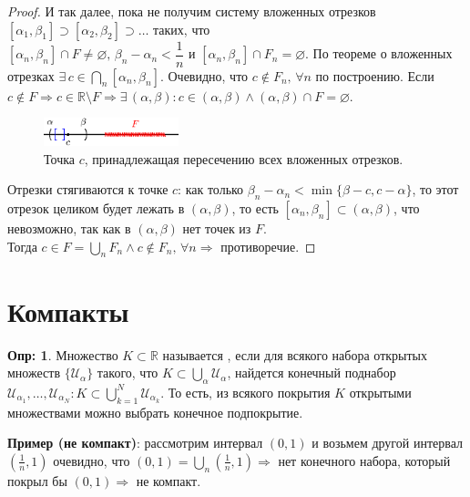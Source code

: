 \documentclass[12pt]{article}
\theoremstyle{definition}
\newtheorem{defn}{Опр:}
\begin{document}
\begin{proof}
	И так далее, пока не получим систему вложенных отрезков $[\alpha_1,\beta_1] \supset [\alpha_2,\beta_2] \supset \dotsc$ таких, что \\
	$[\alpha_n, \beta_n] \cap F \neq \varnothing, \, \beta_n - \alpha_n < \dfrac{1}{n}$ и $[\alpha_n, \beta_n] \cap F_n = \varnothing$. По теореме о вложенных отрезках $\exists \, c \in \bigcap\limits_{n}[\alpha_n,\beta_n]$. Очевидно, что $c \notin F_n, \, \forall n$ по построению. Если $c \notin F \Rightarrow c \in \mathbb{R} \setminus F \Rightarrow \exists \, (\alpha,\beta) \colon c \in (\alpha, \beta) \wedge (\alpha,\beta) \cap F = \varnothing$.

	\begin{figure}[H]
		\centering
		\includegraphics[width=0.35\textwidth]{13_5.eps}
		\caption{Точка $c$, принадлежащая пересечению всех вложенных отрезков.}
		\label{13_5}
	\end{figure}

	Отрезки стягиваются к точке $c$: как только $\beta_n - \alpha_n < \min \{\beta-c,c-\alpha\}$, то этот отрезок целиком будет лежать в $(\alpha,\beta)$, то есть $[\alpha_n, \beta_n] \subset (\alpha, \beta)$, что невозможно, так как в $(\alpha, \beta)$ нет точек из $F$. \\
	Тогда $c \in F = \bigcup\limits_{n} F_n \wedge c \notin F_n, \, \forall n \Rightarrow$ противоречие.
\end{proof}

\section*{Компакты}

\begin{defn}
	Множество $K \subset \mathbb{R}$ называется , если для всякого набора открытых множеств $\{\mathcal{U}_\alpha\}$ такого, что $K \subset \bigcup\limits_{\alpha}\mathcal{U}_\alpha$, найдется конечный поднабор $\mathcal{U}_{\alpha_1}, \dotsc, \mathcal{U}_{\alpha_N} \colon K \subset \bigcup\limits_{k=1}^N \mathcal{U}_{\alpha_k}$. То есть, из всякого покрытия $K$ открытыми множествами можно выбрать конечное подпокрытие.
\end{defn}

\textbf{Пример (не компакт)}: рассмотрим интервал $(0,1)$ и возьмем другой интервал $(\frac{1}{n},1)$ очевидно, что $(0,1) = \bigcup\limits_n (\frac{1}{n},1) \Rightarrow$ нет конечного набора, который покрыл бы $(0,1) \Rightarrow$ не компакт.
\end{document}
